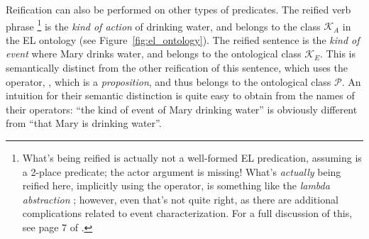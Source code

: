 Reification can also be performed on other types of predicates. The reified verb phrase 
\footnote{What's being reified is actually not a well-formed EL predication, assuming  is a 2-place predicate; the actor argument is missing! What's \textit{actually} being reified here, implicitly using the  operator, is something like the \textit{lambda abstraction} ; however, even that's not quite right, as there are additional complications related to event characterization. For a full discussion of this, see page 7 of \citep{schubert2000episodic}.}
is the \textit{kind of action} of drinking water, and belongs to the class $\mathcal{K}_{A}$ in the EL ontology (see Figure~\ref{fig:el_ontology}). The reified sentence  is the \textit{kind of event} where Mary drinks water, and belongs to the ontological class $\mathcal{K}_{E}$. This is semantically distinct from the other reification of this sentence, which uses the  operator, , which is a \textit{proposition}, and thus belongs to the ontological class $\mathcal{P}$. An intuition for their semantic distinction is quite easy to obtain from the names of their operators: ``the kind of event of Mary drinking water'' is obviously different from ``that Mary is drinking water''.

